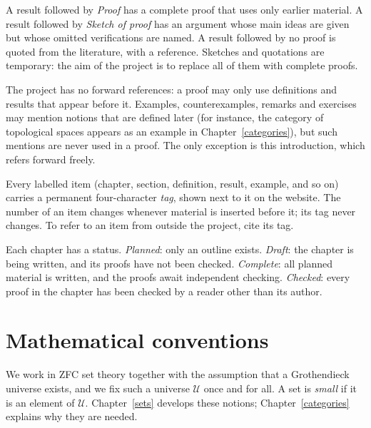 \begin{remark}\label{introduction:remark-proofs}
A result followed by \emph{Proof} has a complete proof that uses only earlier
material. A result followed by \emph{Sketch of proof} has an argument whose
main ideas are given but whose omitted verifications are named. A result
followed by no proof is quoted from the literature, with a reference.
Sketches and quotations are temporary: the aim of the project is to replace
all of them with complete proofs.
\end{remark}

\begin{remark}\label{introduction:remark-no-forward-references}
The project has no forward references: a proof may only use definitions and
results that appear before it. Examples, counterexamples, remarks and
exercises may mention notions that are defined later (for instance, the
category of topological spaces appears as an example in
Chapter~\ref{categories}), but such mentions are never used in a proof. The
only exception is this introduction, which refers forward freely.
\end{remark}

\begin{remark}\label{introduction:remark-tags}
Every labelled item (chapter, section, definition, result, example, and so on)
carries a permanent four-character \emph{tag}, shown next to it on the
website. The number of an item changes whenever material is inserted before
it; its tag never changes. To refer to an item from outside the project, cite
its tag.
\end{remark}

\begin{remark}\label{introduction:remark-status}
Each chapter has a status. \emph{Planned}: only an outline exists.
\emph{Draft}: the chapter is being written, and its proofs have not been
checked. \emph{Complete}: all planned material is written, and the proofs
await independent checking. \emph{Checked}: every proof in the chapter has been
checked by a reader other than its author.
\end{remark}

\section{Mathematical conventions}\label{introduction:section-mathematical-conventions}

\begin{notation}\label{introduction:notation-universe}
We work in ZFC set theory together with the assumption that a Grothendieck
universe exists, and we fix such a universe $\mathcal{U}$ once and for all. A
set is \emph{small} if it is an element of $\mathcal{U}$. Chapter~\ref{sets}
develops these notions; Chapter~\ref{categories} explains why they are needed.
\end{notation}

